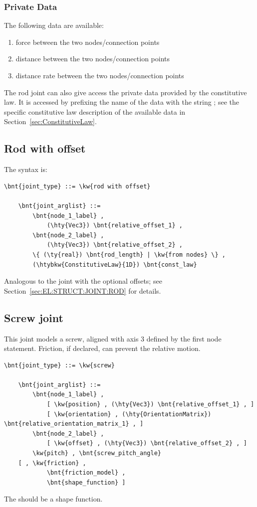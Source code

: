 \subsubsection{Private Data}
The following data are available:
\begin{enumerate}
\item {} force between the two nodes/connection points
\item {} distance between the two nodes/connection points
\item {} distance rate between the two nodes/connection points
\end{enumerate}
The rod joint can also give access the private data provided 
by the constitutive law.
It is accessed by prefixing the name of the data with the string
; see the specific constitutive law
description of the available data in Section~\ref{sec:ConstitutiveLaw}.





\subsection{Rod with offset}
\label{sec:EL:STRUCT:JOINT:ROD_WITH_OFFSET}
The syntax is:
\begin{Verbatim}[commandchars=\\\{\}]
    \bnt{joint_type} ::= \kw{rod with offset}

    \bnt{joint_arglist} ::=
        \bnt{node_1_label} ,
            (\hty{Vec3}) \bnt{relative_offset_1} ,
        \bnt{node_2_label} ,
            (\hty{Vec3}) \bnt{relative_offset_2} ,
        \{ (\ty{real}) \bnt{rod_length} | \kw{from nodes} \} ,
        (\htybkw{ConstitutiveLaw}{1D}) \bnt{const_law}
\end{Verbatim}
Analogous to the  joint with the optional offsets;
see Section~\ref{sec:EL:STRUCT:JOINT:ROD} for details.

\subsection{Screw joint}
\label{sec:screw}
This joint models a screw, aligned with axis 3 defined by the
first node  statement. 
Friction, if declared, can prevent the relative
motion.
\begin{Verbatim}[commandchars=\\\{\}]
    \bnt{joint_type} ::= \kw{screw}

    \bnt{joint_arglist} ::= 
        \bnt{node_1_label} ,
            [ \kw{position} , (\hty{Vec3}) \bnt{relative_offset_1} , ]
            [ \kw{orientation} , (\hty{OrientationMatrix}) \bnt{relative_orientation_matrix_1} , ]
        \bnt{node_2_label} ,
            [ \kw{offset} , (\hty{Vec3}) \bnt{relative_offset_2} , ]
        \kw{pitch} , \bnt{screw_pitch_angle}
	[ , \kw{friction} , 
            \bnt{friction_model} , 
            \bnt{shape_function} ]
\end{Verbatim}
The  should be a  shape function.
